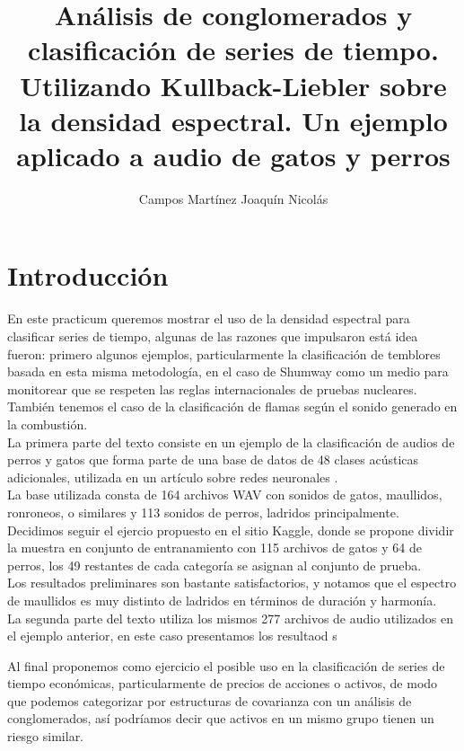 \documentclass[twocolumn,10pt]{asme2ej}
\title{An\'alisis de conglomerados y clasificaci\'on de series de tiempo. Utilizando Kullback-Liebler sobre la densidad espectral. Un ejemplo aplicado a audio de gatos y perros}
\author{Campos Mart\'inez Joaqu\'in Nicol\'as
    \affiliation{
	Alumno de Actuar\'ia\\
	Facultad de Ciencias Actuariales\\
	Universidad An\'ahuac Campus Norte\\
    }	
}
\begin{document}
\maketitle 
\section*{Introducci\'on} %
\label{sec:introduccion}
En este practicum queremos mostrar el uso de la densidad espectral para clasificar series de tiempo, algunas de las razones que impulsaron está idea fueron: primero algunos ejemplos, particularmente la clasificación de temblores basada en esta misma metodología\cite{SUBJ_SP1}\cite{SUBJ_SP2}, en el caso de Shumway como un medio para monitorear que se respeten las reglas internacionales de pruebas nucleares. Tambi\'en tenemos el caso de la clasificaci\'on de flamas seg\'un el sonido generado en la combusti\'on.\cite{SUBJ_SP3}\\

La primera parte del texto consiste en un ejemplo de la clasificaci\'on de audios de perros y gatos que forma parte de una base de datos de 48 clases ac\'usticas adicionales, utilizada en un art\'iculo sobre redes neuronales \cite{DATOS}.\\

La base utilizada consta de 164 archivos WAV con sonidos de gatos, maullidos, ronroneos, o similares y 113 sonidos de perros, ladridos principalmente. Decidimos seguir el ejercio propuesto en el sitio Kaggle\cite{DATOS2}, donde se propone dividir la muestra en conjunto de entranamiento con 115 archivos de gatos y 64 de perros, los 49 restantes de cada categor\'ia se asignan al conjunto de prueba.\\

Los resultados preliminares son bastante satisfactorios, y notamos que el espectro de maullidos es muy distinto de ladridos en t\'erminos de duraci\'on y harmon\'ia.\\

La segunda parte del texto utiliza los mismos 277 archivos de audio utilizados en el ejemplo anterior, en este caso presentamos los resultaod s

Al final proponemos como ejercicio el posible uso en la clasificaci\'on de series de tiempo econ\'omicas, particularmente de precios de acciones o activos, de modo que podemos categorizar por estructuras de covarianza con un análisis de conglomerados, así podríamos decir que activos en un mismo grupo tienen un riesgo similar.\\
\end{document}
